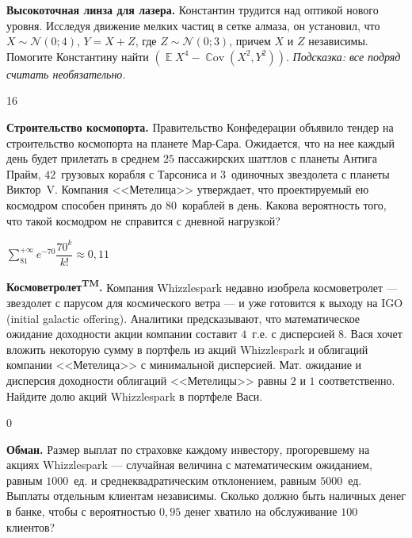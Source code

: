 \documentclass[12pt, addpoints]{exam} %
\DeclareMathOperator{\E}{\mathbb{E}}
\DeclareMathOperator{\Cov}{\mathbb{C}\mathrm{ov}}
\begin{document}
\begin{questions}

\question \textbf{Высокоточная линза для лазера.} Константин трудится над оптикой нового уровня. Исследуя движение мелких частиц в сетке алмаза, он установил, что $X \sim \mathcal{N}(0; 4)$, $Y=X+Z$, где $Z \sim \mathcal{N}(0; 3)$, причем $X$ и $Z$ независимы. Помогите Константину найти $\left(\E{X^4} - \Cov{(X^2, Y^2)}\right)$. {\it Подсказка: все подряд считать необязательно.}
\begin{solution}
16
\end{solution}

\question \textbf{Строительство космопорта.} Правительство Конфедерации объявило тендер на строительство космопорта на планете Мар-Сара. Ожидается, что на нее каждый день будет прилетать в среднем $25$ пассажирских шаттлов с планеты Антига Прайм, $42$~грузовых корабля с Тарсониса и $3$~одиночных звездолета с планеты Виктор~V. Компания <<Метелица>> утверждает, что проектируемый ею космодром способен принять до $80$~кораблей в день. Какова вероятность того, что такой космодром не справится с дневной нагрузкой?
\begin{solution}
$\sum\limits_{81}^{+\infty}e^{-70}\dfrac{70^k}{k!} \approx 0,11$
\end{solution}

\question \textbf{Космоветролет\textsuperscript{TM}.} Компания Whizzlespark недавно изобрела космоветролет --- звездолет с парусом для космического ветра --- и уже готовится к выходу на IGO (initial galactic offering). Аналитики предсказывают, что математическое ожидание доходности акции компании составит $4$~г.е. с дисперсией $8$. Вася хочет вложить некоторую сумму в портфель из акций Whizzlespark и облигаций компании <<Метелица>> с минимальной дисперсией.  Мат. ожидание и дисперсия доходности облигаций <<Метелицы>> равны $2$ и $1$ соответственно. Найдите долю акций Whizzlespark в портфеле Васи.

\begin{solution}
0
\end{solution}


\question  \textbf{Обман.} Размер выплат по страховке каждому инвестору, прогоревшему на акциях Whizzlespark --- случайная величина с математическим ожиданием, равным $1000$~ед. и среднеквадратическим отклонением, равным $5000$~ед. Выплаты отдельным клиентам независимы. Сколько должно быть наличных денег в банке, чтобы с вероятностью $0,95$ денег хватило на обслуживание $100$ клиентов?


\end{questions}
\end{document}
